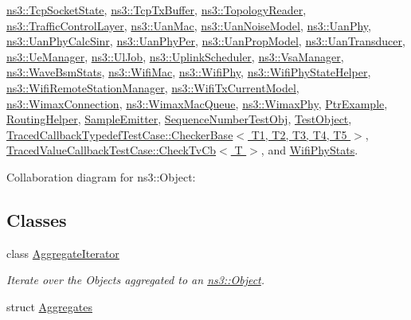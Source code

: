 \hyperlink{classns3_1_1TcpSocketState}{ns3\+::\+Tcp\+Socket\+State}, \hyperlink{classns3_1_1TcpTxBuffer}{ns3\+::\+Tcp\+Tx\+Buffer}, \hyperlink{classns3_1_1TopologyReader}{ns3\+::\+Topology\+Reader}, \hyperlink{classns3_1_1TrafficControlLayer}{ns3\+::\+Traffic\+Control\+Layer}, \hyperlink{classns3_1_1UanMac}{ns3\+::\+Uan\+Mac}, \hyperlink{classns3_1_1UanNoiseModel}{ns3\+::\+Uan\+Noise\+Model}, \hyperlink{classns3_1_1UanPhy}{ns3\+::\+Uan\+Phy}, \hyperlink{classns3_1_1UanPhyCalcSinr}{ns3\+::\+Uan\+Phy\+Calc\+Sinr}, \hyperlink{classns3_1_1UanPhyPer}{ns3\+::\+Uan\+Phy\+Per}, \hyperlink{classns3_1_1UanPropModel}{ns3\+::\+Uan\+Prop\+Model}, \hyperlink{classns3_1_1UanTransducer}{ns3\+::\+Uan\+Transducer}, \hyperlink{classns3_1_1UeManager}{ns3\+::\+Ue\+Manager}, \hyperlink{classns3_1_1UlJob}{ns3\+::\+Ul\+Job}, \hyperlink{classns3_1_1UplinkScheduler}{ns3\+::\+Uplink\+Scheduler}, \hyperlink{classns3_1_1VsaManager}{ns3\+::\+Vsa\+Manager}, \hyperlink{classns3_1_1WaveBsmStats}{ns3\+::\+Wave\+Bsm\+Stats}, \hyperlink{classns3_1_1WifiMac}{ns3\+::\+Wifi\+Mac}, \hyperlink{classns3_1_1WifiPhy}{ns3\+::\+Wifi\+Phy}, \hyperlink{classns3_1_1WifiPhyStateHelper}{ns3\+::\+Wifi\+Phy\+State\+Helper}, \hyperlink{classns3_1_1WifiRemoteStationManager}{ns3\+::\+Wifi\+Remote\+Station\+Manager}, \hyperlink{classns3_1_1WifiTxCurrentModel}{ns3\+::\+Wifi\+Tx\+Current\+Model}, \hyperlink{classns3_1_1WimaxConnection}{ns3\+::\+Wimax\+Connection}, \hyperlink{classns3_1_1WimaxMacQueue}{ns3\+::\+Wimax\+Mac\+Queue}, \hyperlink{classns3_1_1WimaxPhy}{ns3\+::\+Wimax\+Phy}, \hyperlink{classPtrExample}{Ptr\+Example}, \hyperlink{classRoutingHelper}{Routing\+Helper}, \hyperlink{classSampleEmitter}{Sample\+Emitter}, \hyperlink{classSequenceNumberTestObj}{Sequence\+Number\+Test\+Obj}, \hyperlink{classTestObject}{Test\+Object}, \hyperlink{classTracedCallbackTypedefTestCase_1_1CheckerBase}{Traced\+Callback\+Typedef\+Test\+Case\+::\+Checker\+Base$<$ T1, T2, T3, T4, T5 $>$}, \hyperlink{classTracedValueCallbackTestCase_1_1CheckTvCb}{Traced\+Value\+Callback\+Test\+Case\+::\+Check\+Tv\+Cb$<$ T $>$}, and \hyperlink{classWifiPhyStats}{Wifi\+Phy\+Stats}.



Collaboration diagram for ns3\+:\+:Object\+:
\subsection*{Classes}
\begin{DoxyCompactItemize}
\item 
class \hyperlink{classns3_1_1Object_1_1AggregateIterator}{Aggregate\+Iterator}
\begin{DoxyCompactList}\small\item\em Iterate over the Objects aggregated to an \hyperlink{classns3_1_1Object}{ns3\+::\+Object}. \end{DoxyCompactList}\item 
struct \hyperlink{structns3_1_1Object_1_1Aggregates}{Aggregates}
\end{DoxyCompactItemize}
